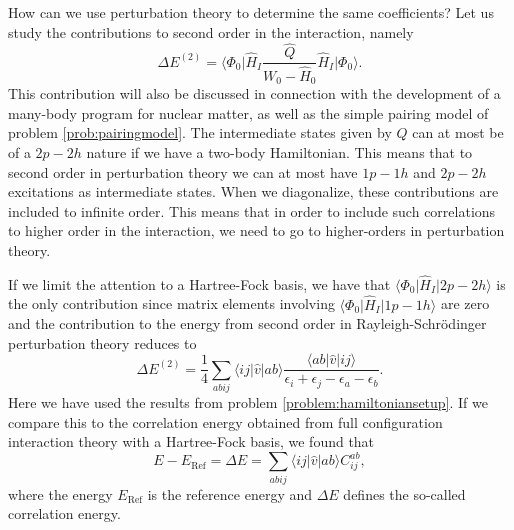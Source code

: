   How can we use perturbation theory to determine the same
  coefficients? Let us study the contributions to second order in the
  interaction, namely
  \[
  \Delta E^{(2)}=\langle\Phi_0\vert
  \hat{H}_I\frac{\hat{Q}}{W_0-\hat{H}_0}\hat{H}_I\vert \Phi_0\rangle.
  \]
  This contribution will also be discussed in connection with the
  development of a many-body program for nuclear matter, as well as
  the simple pairing model of problem \ref{prob:pairingmodel}.  The
  intermediate states given by $\hat{Q}$ can at most be of a $2p-2h$
  nature if we have a two-body Hamiltonian. This means that to second
  order in perturbation theory we can at most have $1p-1h$ and $2p-2h$
  excitations as intermediate states. When we diagonalize, these
  contributions are included to infinite order. This means that in
  order to include such correlations to higher order in the
  interaction, we need to go to higher-orders in perturbation theory.

  If we limit the attention to a Hartree-Fock basis, we have that
  $\langle\Phi_0\vert \hat{H}_I \vert 2p-2h\rangle$ is the only
  contribution since matrix elements involving $\langle\Phi_0\vert
  \hat{H}_I \vert 1p-1h\rangle$ are zero and the contribution to the
  energy from second order in Rayleigh-Schr\"odinger perturbation
  theory reduces to
  \[
  \Delta E^{(2)}=\frac{1}{4}\sum_{abij}\langle ij\vert \hat{v}\vert
  ab\rangle \frac{\langle ab\vert \hat{v}\vert
    ij\rangle}{\epsilon_i+\epsilon_j-\epsilon_a-\epsilon_b}.
  \]
Here we have used the results from problem \ref{problem:hamiltoniansetup}. 
  If we compare this to the correlation energy obtained from full
  configuration interaction theory with a Hartree-Fock basis, we found
  that
  \[
  E-E_{\mathrm{Ref}} =\Delta E=\sum_{abij}\langle ij | \hat{v}| ab
  \rangle C_{ij}^{ab},
  \]
  where the energy $E_{\mathrm{Ref}}$ is the reference energy and
  $\Delta E$ defines the so-called correlation energy.

